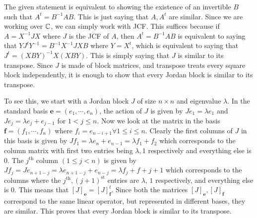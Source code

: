 \begin{sol}
The given statement is equivalent to showing the existence of an invertible $B$ such that $A^t=B^{-1}AB$. This is just saying that $A,A^t$ are similar. Since we are working over $\mathbb{C}$, we can simply work with JCF. This suffices because if $A=X^{-1}JX$ where $J$ is the JCF of $A$, then $A^{t}=B^{-1}AB$ is equivalent to saying that $YJ^tY^{-1} = B^{-1}X^{-1}JXB$ where $Y = X^t$, which is equivalent to saying that $J^t = (XBY)^{-1}X (XBY)$. This is simply saying that $J$ is similar to its transpose. Since $J$ is made of block matrices, and transpose treats every square block independently, it is enough to show that every Jordan block is similar to its transpose.

To see this, we start with a Jordan block $J$ of size $n\times n$ and eigenvalue $\lambda$. In the standard basis $\pmb e=(e_1,\cdots,e_n)$, the action of $J$ is given by $Je_1 = \lambda e_1$ and $Je_j = \lambda e_j+e_{j-1}$ for $1<j\leq n$. Now we look at the matrix in the basis $\pmb f = (f_1,\cdots,f_n)$ where $f_i = e_{n-i+1}\forall 1\leq i\leq n$. Clearly the first columns of $J$ in this basis is given by $Jf_1 = \lambda e_n + e_{n-1} = \lambda f_1 + f_2$ which corresponds to the column matrix with first two entries being $\lambda, 1$ respectively and everything else is $0$. The $j^{\text{th}}$ column $(1\leq j<n)$ is given by $Jf_j = Je_{n+1-j} = \lambda e_{n+1-j} + e_{n-j} = \lambda f_j + f+{j+1}$ which corresponds to the columns where the $j^{\text{th}}, (j+1)^{\text{st}}$ entries are $\lambda$, $1$ respectively, and everything else is $0$. This means that $[J]_{\pmb e} = [J]_{\pmb f}^t$. Since both the matrices $[J]_{\pmb e}, [J]_{\pmb f}$ correspond to the same linear operator, but represented in different bases, they are similar. This proves that every Jordan block is similar to its transpose.
\end{sol}